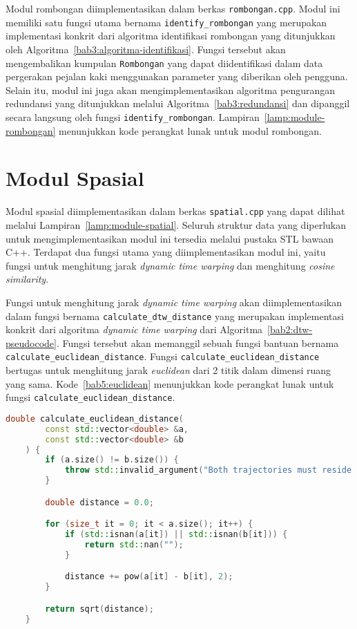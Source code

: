 Modul rombongan diimplementasikan dalam berkas \texttt{rombongan.cpp}. Modul ini memiliki satu fungsi utama bernama \texttt{identify\_rombongan} yang merupakan implementasi konkrit dari algoritma identifikasi rombongan yang ditunjukkan oleh Algoritma~\ref{bab3:algoritma-identifikasi}. Fungsi tersebut akan mengembalikan kumpulan \texttt{Rombongan} yang dapat diidentifikasi dalam data pergerakan pejalan kaki menggunakan parameter yang diberikan oleh pengguna. Selain itu, modul ini juga akan mengimplementasikan algoritma pengurangan redundansi yang ditunjukkan melalui Algoritma~\ref{bab3:redundansi} dan dipanggil secara langsung oleh fungsi \texttt{identify\_rombongan}. Lampiran~\ref{lamp:module-rombongan} menunjukkan kode perangkat lunak untuk modul rombongan.

\section{Modul Spasial}

Modul spasial diimplementasikan dalam berkas \texttt{spatial.cpp} yang dapat dilihat melalui Lampiran~\ref{lamp:module-spatial}. Seluruh struktur data yang diperlukan untuk mengimplementasikan modul ini tersedia melalui pustaka STL bawaan C++. Terdapat dua fungsi utama yang diimplementasikan modul ini, yaitu fungsi untuk menghitung jarak \textit{dynamic time warping} dan menghitung \textit{cosine similarity}.

Fungsi untuk menghitung jarak \textit{dynamic time warping} akan diimplementasikan dalam fungsi bernama \texttt{calculate\_dtw\_distance} yang merupakan implementasi konkrit dari algoritma \textit{dynamic time warping} dari Algoritma~\ref{bab2:dtw-pseudocode}. Fungsi tersebut akan memanggil sebuah fungsi bantuan bernama \texttt{calculate\_euclidean\_distance}. Fungsi \texttt{calculate\_euclidean\_distance} bertugas untuk menghitung jarak \textit{euclidean} dari 2 titik dalam dimensi ruang yang sama. Kode~\ref{bab5:euclidean} menunjukkan kode perangkat lunak untuk fungsi \texttt{calculate\_euclidean\_distance}.

\begin{lstlisting}[language=C++, caption=Implementasi fungsi \texttt{calculate\_euclidean\_distance}, label={bab5:euclidean}]
    double calculate_euclidean_distance(
        const std::vector<double> &a,
        const std::vector<double> &b
    ) {
        if (a.size() != b.size()) {
            throw std::invalid_argument("Both trajectories must reside in the same dimensional space.");
        }

        double distance = 0.0;

        for (size_t it = 0; it < a.size(); it++) {
            if (std::isnan(a[it]) || std::isnan(b[it])) {
                return std::nan("");
            }

            distance += pow(a[it] - b[it], 2);
        }

        return sqrt(distance);
    }
\end{lstlisting}

